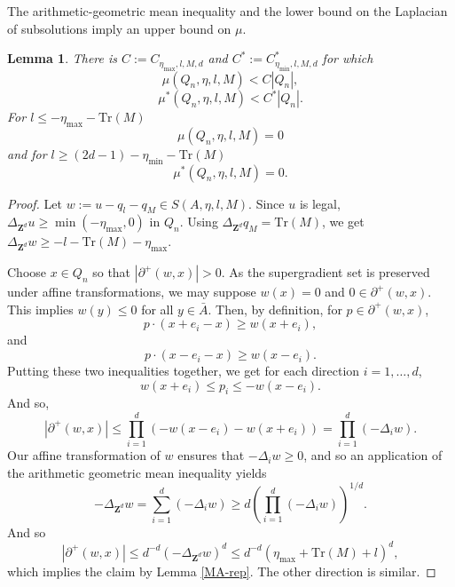 \documentclass[12pt]{amsart}
\newcommand{\Z}{\mathbf{Z}}
\newtheorem{lemma}[theorem]{Lemma}
\begin{document}
The arithmetic-geometric mean inequality and the lower bound on the Laplacian of subsolutions imply an upper bound on $\mu$. 
\begin{lemma} \label{mu-is-bounded}
There is $C := C_{ \eta_{\max}, l, M, d}$ and $C^* := C_{\eta_{\min}, l, M, d}^*$  for which 
\[
\mu(Q_n, \eta, l ,M) < C |Q_n| ,
\]
\[
\mu^*(Q_n, \eta, l ,M) < C^* |Q_n|.
\]
For $l \leq -\eta_{\max} - \mbox{Tr}(M)$
\[
\mu(Q_n, \eta, l , M) = 0 
\]
and for $l \geq (2 d-1) - \eta_{\min} - \mbox{Tr}(M)$
\[
\mu^*(Q_n, \eta, l, M) = 0. 
\]

\end{lemma}

\begin{proof}



Let $w := u - q_l - q_M \in S(A, \eta, l, M)$. Since $u$ is legal,  $\Delta_{\Z^d} u \geq \min(-\eta_{\max},0)$ in $Q_n$. 
Using $\Delta_{\Z^d} q_M = \mbox{Tr}(M)$, we get $\Delta_{\Z^d} w \geq  - l - \mbox{Tr}(M) -\eta_{\max}$.  

Choose $x \in Q_n$ so that  $|\partial^+(w, x)| > 0$. As the supergradient set is preserved under affine transformations, we may suppose $w(x) = 0$ and $0 \in \partial^+(w, x)$. 
 This implies $w(y) \leq 0$ for all $y \in \bar{A}$. Then, by definition, for $p \in \partial^+(w,x)$, 
\[
p \cdot(x + e_i - x)  \geq w(x+e_i),
\]
and
\[
p \cdot( x - e_i - x) \geq w(x-e_i). 
\]
Putting these two inequalities together, we get for each direction $i = 1, \ldots, d$, 
\begin{equation} \label{discreteMA1}
w(x+e_i)  \leq p_i \leq - w(x-e_i). 
\end{equation}
And so, 
\[
|\partial^+(w,x)| \leq \prod_{i=1}^d \left(- w(x-e_i) - w(x+e_i) \right) = \prod_{i=1}^d (- \Delta_i w).
\]
Our affine transformation of $w$ ensures that $-\Delta_i w \geq 0$, and so an application of the arithmetic geometric mean inequality yields
\[
- \Delta_{\Z^d} w = \sum_{i=1}^d (-\Delta_i w) \geq d \left( \prod_{i=1}^d (-\Delta_i w) \right)^{1/d}.
\]
And so
\begin{equation}
|\partial^+(w,x)|  \leq  d^{-d} (-\Delta_{\Z^d} w)^d \leq  d^{-d} (\eta_{\max} + \mbox{Tr}(M) + l)^d, 
\end{equation}
which implies the claim by Lemma \ref{MA-rep}. The other direction is similar. 






\end{proof}
\end{document}

